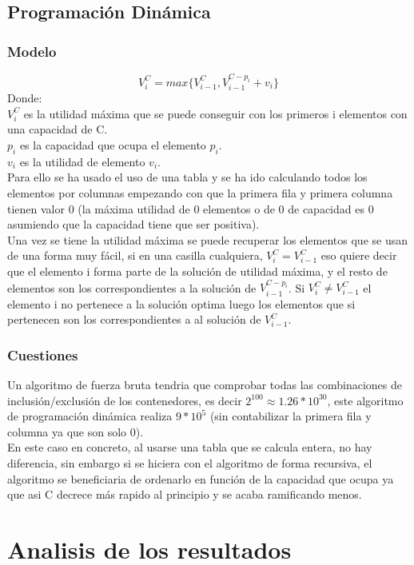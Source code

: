 \documentclass[11pt,spanish]{article}
\begin{document}
		\subsection{Programación Dinámica}
			\subsubsection{Modelo}
			$$V_i^C = max\{V_{i-1}^C,V_{i-1}^{C-p_i}+v_i\} $$
			Donde:\\
			$V_i^C$ es la utilidad máxima que se puede conseguir con los primeros i elementos con una capacidad de C.\\
			$p_i$ es la capacidad que ocupa el elemento $p_i$.\\
			$v_i$ es la utilidad de elemento $v_i$.\\
			Para ello se ha usado el uso de una tabla y se ha ido calculando todos los elementos por columnas empezando con que la primera fila y primera columna tienen valor 0 (la máxima utilidad de 0 elementos o de 0 de capacidad es 0 asumiendo que la capacidad tiene que ser positiva).\\
			Una vez se tiene la utilidad máxima se puede recuperar los elementos que se usan de una forma muy fácil, si en una casilla cualquiera, $V_i^C=V_{i-1}^C$ eso quiere decir que el elemento i forma parte de la solución de utilidad máxima, y el resto de elementos son los correspondientes a la solución de $V_{i-1}^{C-p_i}$. Si $V_i^C \neq V_{i-1}^C$ el elemento i no pertenece a la solución optima luego los elementos que si pertenecen son los correspondientes a al solución de $V_{i-1}^C$.
			\subsubsection{Cuestiones}
			Un algoritmo de fuerza bruta tendria que comprobar todas las combinaciones de inclusión/exclusión de los contenedores, es decir $2^{100} \approx 1.26*10^{30}$, este algoritmo de programación dinámica realiza $9*10^5$ (sin contabilizar la primera fila y columna ya que son solo 0).\\
			En este caso en concreto, al usarse una tabla que se calcula entera, no hay diferencia, sin embargo si se hiciera con el algoritmo de forma recursiva, el algoritmo se beneficiaria de ordenarlo en función de la capacidad que ocupa ya que asi C decrece más rapido al principio y se acaba ramificando menos.
	\section{Analisis de los resultados}
\end{document}
